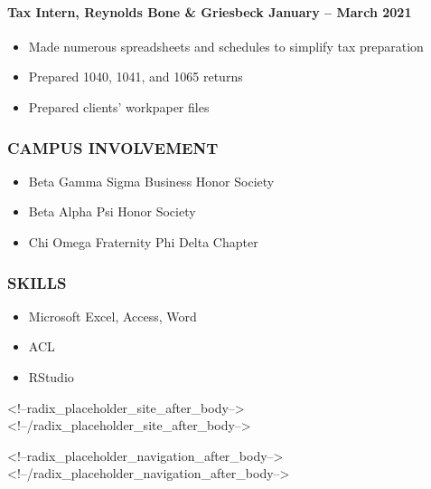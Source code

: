 \documentclass[
]{article}
\providecommand{\tightlist}{%
  \setlength{\itemsep}{0pt}\setlength{\parskip}{0pt}}
\begin{document}
\hypertarget{tax-intern-reynolds-bone-griesbeck-january-march-2021}{%
\paragraph{Tax Intern, Reynolds Bone \& Griesbeck January -- March
2021}\label{tax-intern-reynolds-bone-griesbeck-january-march-2021}}

\begin{itemize}
\tightlist
\item
  Made numerous spreadsheets and schedules to simplify tax preparation
\item
  Prepared 1040, 1041, and 1065 returns
\item
  Prepared clients' workpaper files
\end{itemize}

\hypertarget{campus-involvement}{%
\subsubsection{CAMPUS INVOLVEMENT}\label{campus-involvement}}

\begin{itemize}
\tightlist
\item
  Beta Gamma Sigma Business Honor Society
\item
  Beta Alpha Psi Honor Society
\item
  Chi Omega Fraternity Phi Delta Chapter
\end{itemize}

\hypertarget{skills}{%
\subsubsection{SKILLS}\label{skills}}

\begin{itemize}
\tightlist
\item
  Microsoft Excel, Access, Word
\item
  ACL
\item
  RStudio
\end{itemize}

<!--radix_placeholder_site_after_body-->
<!--/radix_placeholder_site_after_body-->

<!--radix_placeholder_navigation_after_body-->
<!--/radix_placeholder_navigation_after_body-->
\end{document}

